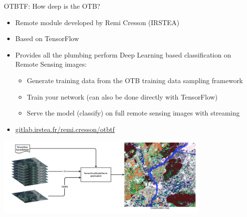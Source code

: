 \begin{frame}{OTBTF: How deep is the OTB?}
  \begin{itemize}
  \item Remote  module developed by Remi Cresson (IRSTEA)
  \item Based on TensorFlow
  \item Provides all the plumbing perform Deep Learning based classification on Remote Sensing images:
    \begin{itemize}
      \item Generate training data from the OTB training data sampling framework
      \item Train your network (can also be done directly with TensorFlow)
      \item Serve the model (classify) on full remote sensing images with streaming
    \end{itemize}
    \item \url{gitlab.irstea.fr/remi.cresson/otbtf}
  \end{itemize}
\begin{center}
  \includegraphics[width=0.8\textwidth]{images/classif_map.png}
\end{center}
\end{frame}
  
